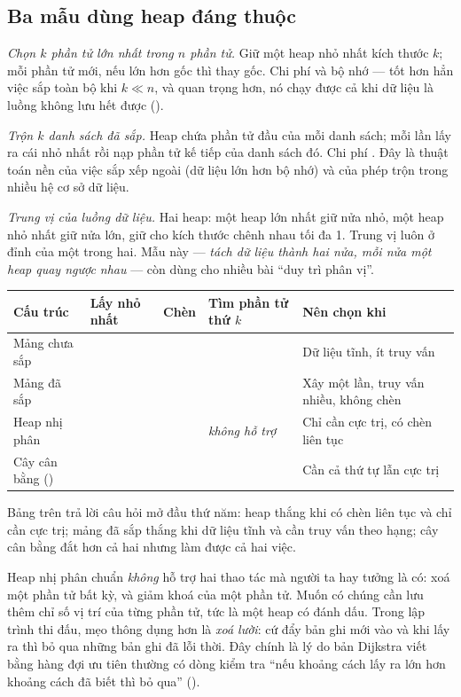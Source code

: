 \documentclass[../../algorithm.tex]{subfiles}
\begin{document}
\subsection{Ba mẫu dùng heap đáng thuộc}

\emph{Chọn \(k\) phần tử lớn nhất trong \(n\) phần tử.} Giữ một heap nhỏ nhất kích thước \(k\); mỗi phần tử mới, nếu lớn hơn gốc thì thay gốc. Chi phí  và bộ nhớ  --- tốt hơn hẳn việc sắp toàn bộ khi \(k \ll n\), và quan trọng hơn, nó chạy được cả khi dữ liệu là luồng không lưu hết được ().

\emph{Trộn \(k\) danh sách đã sắp.} Heap chứa phần tử đầu của mỗi danh sách; mỗi lần lấy ra cái nhỏ nhất rồi nạp phần tử kế tiếp của danh sách đó. Chi phí . Đây là thuật toán nền của việc sắp xếp ngoài (dữ liệu lớn hơn bộ nhớ) và của phép trộn trong nhiều hệ cơ sở dữ liệu.

\emph{Trung vị của luồng dữ liệu.} Hai heap: một heap lớn nhất giữ nửa nhỏ, một heap nhỏ nhất giữ nửa lớn, giữ cho kích thước chênh nhau tối đa 1. Trung vị luôn ở đỉnh của một trong hai. Mẫu này --- \emph{tách dữ liệu thành hai nửa, mỗi nửa một heap quay ngược nhau} --- còn dùng cho nhiều bài ``duy trì phân vị''.

\begin{center}\footnotesize
\begin{tabularx}{\linewidth}{@{}L{3.0cm}L{2.3cm}L{2.3cm}L{2.4cm}Y@{}}
\toprule
\textbf{Cấu trúc} & \textbf{Lấy nhỏ nhất} & \textbf{Chèn} & \textbf{Tìm phần tử thứ \(k\)} & \textbf{Nên chọn khi}\\
\midrule
Mảng chưa sắp &  &  &  & Dữ liệu tĩnh, ít truy vấn\\
Mảng đã sắp &  &  &  & Xây một lần, truy vấn nhiều, không chèn\\
Heap nhị phân &  &  & \emph{không hỗ trợ} & Chỉ cần cực trị, có chèn liên tục\\
Cây cân bằng () &  &  &  & Cần cả thứ tự lẫn cực trị\\
\bottomrule
\end{tabularx}
\end{center}

Bảng trên trả lời câu hỏi mở đầu thứ năm: heap thắng khi có chèn liên tục và chỉ cần cực trị; mảng đã sắp thắng khi dữ liệu tĩnh và cần truy vấn theo hạng; cây cân bằng đắt hơn cả hai nhưng làm được cả hai việc.

\begin{cambay}
Heap nhị phân chuẩn \emph{không} hỗ trợ hai thao tác mà người ta hay tưởng là có: xoá một phần tử bất kỳ, và giảm khoá của một phần tử. Muốn có chúng cần lưu thêm chỉ số vị trí của từng phần tử, tức là một heap có đánh dấu. Trong lập trình thi đấu, mẹo thông dụng hơn là \emph{xoá lười}: cứ đẩy bản ghi mới vào và khi lấy ra thì bỏ qua những bản ghi đã lỗi thời. Đây chính là lý do bản Dijkstra viết bằng hàng đợi ưu tiên thường có dòng kiểm tra ``nếu khoảng cách lấy ra lớn hơn khoảng cách đã biết thì bỏ qua'' ().
\end{cambay}
\end{document}
